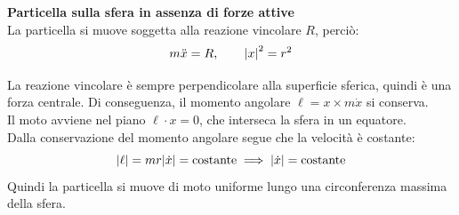 \begin{example}
    \textbf{Particella sulla sfera in assenza di forze attive}\\

    La particella si muove soggetta alla reazione vincolare $R $, perciò:
    \begin{equation*}
        m \ddot{x} = R, \qquad \abs{x}^2 = r^2
    \end{equation*}

    La reazione vincolare è sempre perpendicolare alla superficie sferica, quindi è una forza centrale. 
    Di conseguenza, il momento angolare $\ell = x \times m\dot{x}$ si conserva.\\
    Il moto avviene nel piano $\ell \cdot x = 0$, che interseca la sfera in un equatore. \\
    Dalla conservazione del momento angolare segue che la velocità è costante:
    \begin{equation*}
        \abs{\ell} = m r \abs{\dot{x}} = \text{costante} \implies \abs{\dot{x}} = \text{costante}
    \end{equation*}
    Quindi la particella si muove di moto uniforme lungo una circonferenza massima della sfera.
\end{example}

